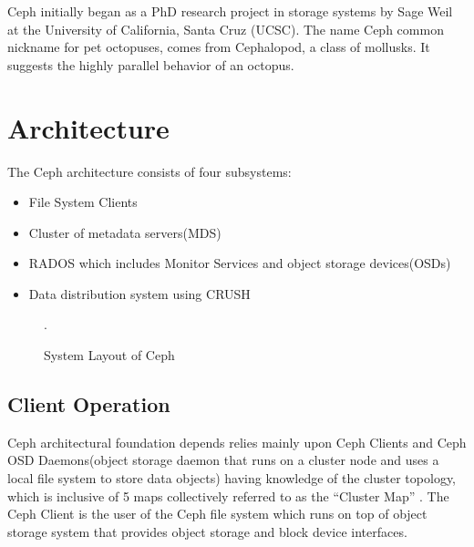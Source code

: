 \documentclass[9pt,twocolumn,twoside]{styles/osajnl}
\begin{document}
Ceph initially began as a PhD research project in storage systems by
Sage Weil at the University of California, Santa Cruz (UCSC). The name
Ceph common nickname for pet octopuses, comes from Cephalopod, a class
of mollusks. It suggests the highly parallel behavior of an octopus.

\section{Architecture}

The Ceph architecture consists of four subsystems:
\begin{itemize}
\item File System Clients
\item Cluster of metadata servers(MDS)
\item RADOS which includes Monitor Services and object storage
  devices(OSDs)
\item Data distribution system using CRUSH
\end{itemize}

\begin{figure}[htbp]
\centering
{}
\caption{System Layout of Ceph \cite{paper-Ceph}}.
\label{CSL}
\end{figure}

\subsection{Client Operation} 
Ceph architectural foundation depends relies mainly upon Ceph Clients
and Ceph OSD Daemons(object storage daemon that runs on a cluster node
and uses a local file system to store data objects) having knowledge
of the cluster topology, which is inclusive of 5 maps collectively
referred to as the “Cluster Map” \cite{www-ceph-architecture}. The
Ceph Client is the user of the Ceph file system which runs on top of
object storage system that provides object storage and block device
interfaces.
\end{document}
